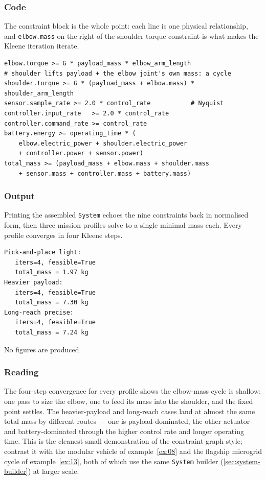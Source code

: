 \documentclass[11pt,a4paper]{article}
\begin{document}
\subsubsection*{Code}

The constraint block is the whole point: each line is one physical
relationship, and \texttt{elbow.mass} on the right of the shoulder
torque constraint is what makes the Kleene iteration iterate.

\begin{lstlisting}
elbow.torque >= G * payload_mass * elbow_arm_length
# shoulder lifts payload + the elbow joint's own mass: a cycle
shoulder.torque >= G * (payload_mass + elbow.mass) * shoulder_arm_length
sensor.sample_rate >= 2.0 * control_rate           # Nyquist
controller.input_rate   >= 2.0 * control_rate
controller.command_rate >= control_rate
battery.energy >= operating_time * (
    elbow.electric_power + shoulder.electric_power
    + controller.power + sensor.power)
total_mass >= (payload_mass + elbow.mass + shoulder.mass
    + sensor.mass + controller.mass + battery.mass)
\end{lstlisting}

\subsubsection*{Output}

Printing the assembled \texttt{System} echoes the nine constraints back
in normalised form, then three mission profiles solve to a single
minimal mass each. Every profile converges in four Kleene steps.

\begin{lstlisting}[language={},numbers=none,keywordstyle={}]
Pick-and-place light:
   iters=4, feasible=True
   total_mass = 1.97 kg
Heavier payload:
   iters=4, feasible=True
   total_mass = 7.30 kg
Long-reach precise:
   iters=4, feasible=True
   total_mass = 7.24 kg
\end{lstlisting}

No figures are produced.

\subsubsection*{Reading}

The four-step convergence for every profile shows the elbow-mass cycle
is shallow: one pass to size the elbow, one to feed its mass into the
shoulder, and the fixed point settles. The heavier-payload and
long-reach cases land at almost the same total mass by different routes
--- one is payload-dominated, the other actuator- and battery-dominated
through the higher control rate and longer operating time. This is the
cleanest small demonstration of the constraint-graph style; contrast it
with the modular vehicle of example~\ref{ex:08} and the flagship
microgrid cycle of example~\ref{ex:13}, both of which use the same
\texttt{System} builder (\ref{sec:system-builder}) at larger scale.
\end{document}
